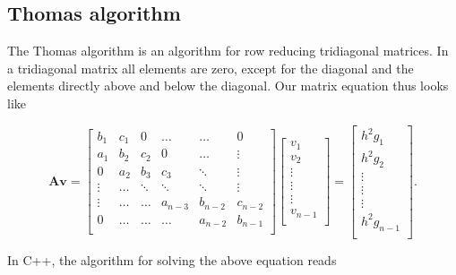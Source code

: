 \documentclass{emulateapj}
\begin{document}
\subsection{Thomas algorithm}
\label{sec:thomas}

The Thomas algorithm is an algorithm for row reducing tridiagonal matrices. 
In a tridiagonal matrix all elements are zero, except for the diagonal and the elements directly above and below the diagonal. Our matrix equation thus looks like

\begin{equation*}
    \mathbf{A}\mathbf{v} = \begin{bmatrix}
       b_1    & c_1    & 0      & \ldots  & \ldots  & 0 \\
       a_1    & b_2    & c_2    & 0       & \ldots  & \vdots \\
       0      & a_2    & b_3    & c_3     & \ddots  & \vdots \\
       \vdots & \ldots & \ddots & \ddots  & \ddots  & \vdots \\
       \vdots & \ldots & \ldots & a_{n-3} & b_{n-2} & c_{n-2} \\
       0      & \ldots & \ldots & \ldots  & a_{n-2} & b_{n-1} \\
    \end{bmatrix}\begin{bmatrix}
        v_1\\
        v_2\\
        \vdots \\
        \vdots  \\
        \vdots \\
        v_{n-1}\\
    \end{bmatrix}
    =\begin{bmatrix}
        h^{2}g_{1} \\
        h^{2}g_{2} \\
        \vdots      \\
        \vdots      \\
        \vdots      \\
        h^{2}g_{n-1} \\
    \end{bmatrix}.
\end{equation*}

In C++, the algorithm for solving the above equation reads
\end{document}
